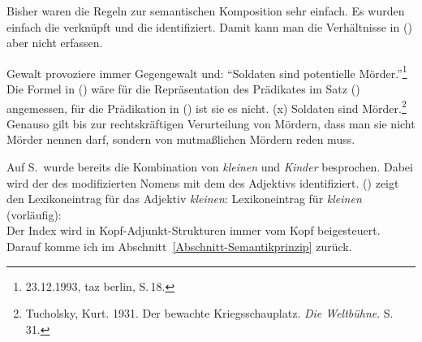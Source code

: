 Bisher waren die Regeln zur semantischen Komposition sehr einfach. Es wurden einfach die \relslen
verknüpft und die \ltopwe identifiziert. Damit kann man die Verhältnisse in () aber nicht erfassen.

\ea
\label{soldat}

Gewalt provoziere immer Gegengewalt und: "`Soldaten sind potentielle Mörder."'\footnote{
23.12.1993, taz berlin, S.\,18.
}
\z
Die Formel in () wäre für die Repräsentation des Prädikates im Satz () angemessen, für
die Prädikation in () ist sie es nicht.
\ea
{}(x)
\z
\ea
Soldaten sind Mörder.\footnote{
  Tucholsky, Kurt. 1931. Der bewachte Kriegsschauplatz. \emph{Die Weltbühne}. S.\,31.
}
\z
Genauso gilt bis zur rechtskräftigen Verurteilung von Mördern, dass man sie nicht Mörder nennen
darf, sondern von mutmaßlichen Mördern reden muss. 

Auf S.\,\pageref{page-kleinen-Kinder} wurde bereits die Kombination von \emph{kleinen} und
\emph{Kinder} besprochen. Dabei wird der \ltopw des modifizierten Nomens mit dem \ltopw des
Adjektivs identifiziert. () zeigt den Lexikoneintrag für das Adjektiv \emph{kleinen}:
\eas
\label{le-kleinen-vorläufig}%
Lexikoneintrag für \emph{kleinen} (vorläufig):\\
\zs
Der Index wird in Kopf-Adjunkt-Strukturen immer vom Kopf beigesteuert. Darauf komme ich im Abschnitt~\ref{Abschnitt-Semantikprinzip} zurück.

